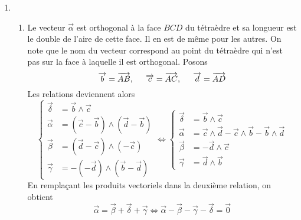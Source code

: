 \begin{enumerate}
 \item 
\begin{enumerate}
\item Le vecteur $\overrightarrow{\alpha}$ est orthogonal à la face $BCD$ du tétraèdre et sa longueur est le double de l'aire de cette face. Il en est de même pour les autres. On note que le nom du vecteur correspond au point du tétraèdre qui n'est pas sur la face à laquelle il est orthogonal.\newline
Posons
\begin{displaymath}
 \overrightarrow{b}=\overrightarrow{AB},\hspace{0.5cm}
 \overrightarrow{c}=\overrightarrow{AC},\hspace{0.5cm}
 \overrightarrow{d}=\overrightarrow{AD}
\end{displaymath}
Les relations deviennent alors
\begin{displaymath}
 \left\lbrace 
\begin{aligned}
 \overrightarrow{\delta} &= \overrightarrow{b}\wedge \overrightarrow{c}\\ 
\overrightarrow{\alpha} &= (\overrightarrow{c}-\overrightarrow{b})\wedge (\overrightarrow{d}-\overrightarrow{b})\\
\overrightarrow{\beta} &= (\overrightarrow{d}-\overrightarrow{c})\wedge (-\overrightarrow{c})\\
\overrightarrow{\gamma} &= -(-\overrightarrow{d})\wedge (\overrightarrow{b}-\overrightarrow{d})
\end{aligned}
\right. 
\Leftrightarrow
 \left\lbrace 
\begin{aligned}
 \overrightarrow{\delta} &= \overrightarrow{b}\wedge \overrightarrow{c}\\ 
\overrightarrow{\alpha} &= \overrightarrow{c}\wedge \overrightarrow{d} -\overrightarrow{c}\wedge \overrightarrow{b} -\overrightarrow{b}\wedge \overrightarrow{d}\\
\overrightarrow{\beta} &= -\overrightarrow{d}\wedge \overrightarrow{c}\\
\overrightarrow{\gamma} &= \overrightarrow{d}\wedge \overrightarrow{b}
\end{aligned}
\right. 
\end{displaymath}
En remplaçant les produits vectoriels dans la deuxième relation, on obtient
\begin{displaymath}
 \overrightarrow{\alpha} = \overrightarrow{\beta} +\overrightarrow{\delta} +\overrightarrow{\gamma}
\Leftrightarrow
 \overrightarrow{\alpha} - \overrightarrow{\beta} - \overrightarrow{\gamma} -\overrightarrow{\delta}= \overrightarrow{0}
\end{displaymath}


\end{enumerate}
\end{enumerate}
